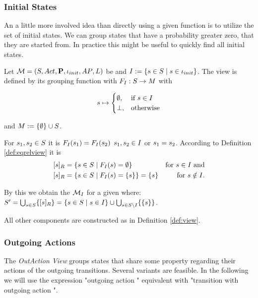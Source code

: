 \documentclass[preview]{standalone}
\begin{document}

\subsubsection{Initial States}
An a little more involved idea than directly using a given function is to utilize the set of initial states. We can group states that have a probability greater zero, that they are started from. In practice this might be useful to quickly find all initial states.

\begin{definition}
	Let ${{{\mathcal{M}}}} = {{({S}, {Act}, {\textbf{P}}, {\iota_{init}}, {AP}, {L})}}$ be \chosengraphtypeN and ${I} := \{{s} \in {S} \mid {s} \in {\ensuremath{{\iota_{init}}}}\}$. The view \viewinitstates is defined by its grouping function \gfctinitstates \grpfctN with ${{F_{{I}}}} : {S} \to {\ensuremath{{M}}}$ with 
	
	\[
	{s} \mapsto
	\begin{cases}
		\emptyset,				& \text{if } {s} \in {I} \\
		{\bot},          	& \text{otherwise}
	\end{cases}
	\]
	
	and ${{M}} := \{\emptyset\} \cup {\ensuremath{{S}}}$.
\end{definition}

For ${s}_1,{s}_2 \in {S}$ it is ${{F_{{I}}}}({s}_1) = {{F_{{I}}}}({s}_2)$ \iffN ${s}_1, {s}_2 \in {I}$ or ${s}_1 = {s}_2$. According to Definition \ref{def:eqrelview} it is 
\begin{align*}
	{\ensuremath{{[{s}]_{{R}}}}} &= \{{s} \in {S} \mid {\ensuremath{{F_{{I}}}}}({s}) = \emptyset\} &\text{for } {s} \in {I} \text{ and} \\
	{{[{s}]_{{R}}}} &= \{{s} \in {S} \mid {\ensuremath{{F_{{I}}}}}({s}) = \{{s}\} \} = \{{s}\} &\text{for } {s} \notin {I}.
\end{align*}


By this we obtain the \viewN ${{{{{\mathcal{M}}}}_{{I}}}}$ for a given \chosengraphtypeN \chgph where: ${S}' = \bigcup_{{s} \in {S}} \{{{[{s}]_{{R}}}}\} = \{{s} \in {S} \mid {s} \in {I}\}\cup \bigcup_{{s} \in {S} \setminus {I}}\{\{{s}\}\}$.

All other components are constructed as in Definition \ref{def:view}.

\subsubsection{Outgoing Actions}
The \emph{OutAction View} groups states that share some property regarding their actions  of the outgoing transitions. Several variants are feasible. In the following we will use the expression "outgoing action \action" equivalent with "transition with outgoing action \action".
\end{document}
